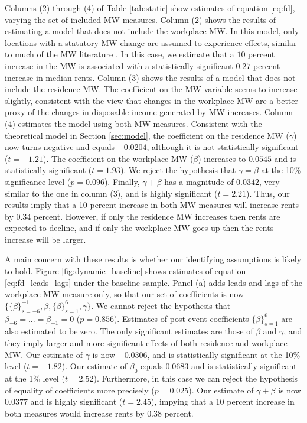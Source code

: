 Columns (2) through (4) of Table \ref{tab:static} show estimates of equation 
\eqref{eq:fd}, varying the set of included MW measures.
Column (2) shows the results of estimating a model that does not include the 
workplace MW.
In this model, only locations with a statutory MW change are assumed to 
experience effects, similar to much of the MW literature 
\parencite[e.g.,][]{DubeEtAl2010, MeerWest2016, Yamagishi2021}.
In this case, we estimate that a $10$ percent increase in the MW is associated 
with a statistically significant $0.27$ percent increase in median rents.
Column (3) shows the results of a model that does not include the residence MW.
The coefficient on the MW variable seems to increase slightly, consistent with 
the view that changes in the workplace MW are a better proxy of the changes in 
disposable income generated by MW increases.
Column (4) estimates the model using both MW measures.
Consistent with the theoretical model in Section \ref{sec:model}, the 
coefficient on the residence MW ($\gamma$) now turns negative and equals 
$-0.0204$, although it is not statistically significant ($t=-1.21$).
The coefficient on the workplace MW ($\beta$) increases to $0.0545$ and is 
statistically significant ($t=1.93$).
We reject the hypothesis that $\gamma=\beta$ at the 10\% significance level 
($p = 0.096$).
Finally, $\gamma+\beta$ has a magnitude of $0.0342$, very similar to the one 
in column (3), and is highly significant ($t=2.21$).
Thus, our results imply that a 10 percent increase in both MW measures will 
increase rents by $0.34$ percent.
However, if only the residence MW increases then rents are expected to decline,
and if only the workplace MW goes up then the rents increase will be larger.

A main concern with these results is whether our identifying assumptions is 
likely to hold.
Figure \ref{fig:dynamic_baseline} shows estimates of equation 
\eqref{eq:fd_leads_lags} under the baseline sample.
Panel (a) adds leads and lags of the workplace MW measure only, so that
our set of coefficients is now 
$\{\{\beta\}_{s=-6}^{-1},\beta,\{\beta\}_{s=1}^6,\gamma\}$.
We cannot reject the hypothesis that $\beta_{-6}=...=\beta_{-1}=0$ 
($p = 0.856$).
Estimates of post-event coefficients $\{\beta\}_{s=1}^6$ are also estimated to 
be zero.
The only significant estimates are those of $\beta$ and $\gamma$, and they 
imply larger and more significant effects of both residence and workplace MW.
Our estimate of $\gamma$ is now $-0.0306$, and is statistically significant 
at the 10\% level ($t=-1.82$).
Our estimate of $\beta_0$ equals $0.0683$ and is statistically 
significant at the 1\% level ($t=2.52$).
Furthermore, in this case we can reject the hypothesis of equality of coefficients more
precisely ($p = 0.025$).
Our estimate of $\gamma+\beta$ is now $0.0377$ and is highly significant 
($t=2.45$), impying that a 10 percent increase in both measures would increase
rents by $0.38$ percent.


